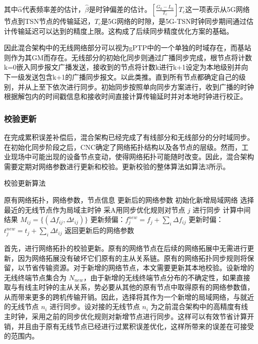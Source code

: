 \documentclass[UTF8,a4paper,12pt]{ctexart}
\numberwithin{equation}{section}
\begin{document}
	其中$\widehat{\alpha}$代表频率差的估计，$\widehat{\beta}$是时钟偏差的估计。$[\frac{G_0-L_0}{T_c}]T_c$这一项表示从5G网络节点到TSN节点的传输延迟，$T_c$是5G网络的时隙，是5G-TSN时钟同步期间通过估计传输延迟可以达到的精度上限。这构成了后续同步精度优化方案的基础。
	
	因此混合架构中的无线网络部分可以视为gPTP中的一个单独的时域存在，而基站则作为其GM而存在。无线部分的初始化同步则通过广播同步完成，根节点将计数k=0嵌入同步报文广播发送，接收到的节点将计数k进行k+1设定为本地级别并向下一级发送包含k+1的广播同步报文。以此类推。直到所有节点都确定自己的级别，并从上至下依次进行同步。初始同步按照单向同步方案进行，收到广播的时钟根据解包内的时间戳信息和接收时间直接计算传输延时并对本地时钟进行校正。
	
	\subsubsection{校验更新}
	在完成累积误差补偿后，混合架构已经完成了有线部分和无线部分的分时域同步。在初始化同步阶段之后，CNC确定了网络拓扑结构以及各节点的层级。然而，工业现场中可能出现的设备节点变动，使得网络拓扑可能随时改变。因此，混合架构需要定期对网络参数进行更新和校验。更新校验的整体算法如算法3所示。
	\begin{algorithm}
		\caption{校验更新算法}
		\begin{algorithmic}[1]
			\REQUIRE
			原有网络拓扑，网络参数，节点信息
			\ENSURE
			更新后的网络参数
			\STATE 初始化新增局域网络
			\STATE 选择最近的无线节点作为局域主时钟
			\STATE 采A用同步优化规则对节点 $j$ 进行同步
			\ENDFOR
			\STATE 计算中间结果 $M_{ij} = \{(\Delta f_{ij}, \Delta t_{ij})\}$
			\STATE 更新频偏：$f_j^{new} = f_j + \sum_{i} \Delta f_{ij}$
			\STATE 更新时偏：$t_j^{new} = t_j + \sum_{i} \Delta t_{ij}$
			\ENDFOR
			\STATE 返回更新后的网络参数
		\end{algorithmic}
	\end{algorithm}
	首先，进行网络拓扑的校验更新。原有的网络节点在后续的网络拓展中无需进行更新，因为网络拓展没有破坏它们原有的主从关系链。原有的网络拓扑同步规则将保留，以节省传输资源。对于新增的网络节点，本文需要更新其本地校验。设新增的无线终端节点集合为 $N_{new}$，由于新增的无线终端节点分布的不确定性，如果直接取与有线主时钟的主从关系，势必要从其他的原有节点中取得原有的网络参数值，从而带来更多的跨机传输开销。因此，选择将其作为一个新增的局域网络，与就近的无线节点 $n_i$ 进行同步。设对接的无线节点 $n_i$ 为之前混合架构中的高精度有线主时钟，采用之前的同步优化规则对新增节点进行同步。这样可以有效节省计算开销，并且由于原有无线节点已经进行过累积误差优化，这样所带来的误差在可接受的范围内。
	
\end{document}

